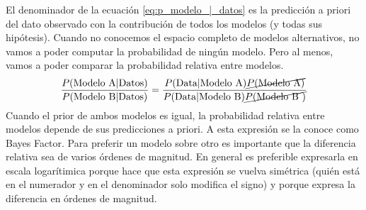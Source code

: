 \documentclass[a4paper,10pt]{book}
\theoremstyle{definition}
\begin{document}
El denominador de la ecuación \ref{eq:p_modelo_|_datos} es la predicción a priori del dato observado con la contribución de todos los modelos (y todas sus hipótesis).
%
Cuando no conocemos el espacio completo de modelos alternativos, no vamos a poder computar la probabilidad de ningún modelo.
%
Pero al menos, vamos a poder comparar la probabilidad relativa entre modelos.
%
 \begin{equation}
\begin{split}
 \frac{P(\text{Modelo A}|\text{Datos})}{P(\text{Modelo B}|\text{Datos})} = \frac{P(\text{Data}|\text{Modelo A})\cancel{P(\text{Modelo A})}}{P(\text{Data}|\text{Modelo B})\cancel{P(\text{Modelo B })}}
\end{split}
\end{equation}
%
Cuando el prior de ambos modelos es igual, la probabilidad relativa entre modelos depende de sus predicciones a priori.
%
A esta expresión se la conoce como Bayes Factor.
%
Para preferir un modelo sobre otro es importante que la diferencia relativa sea de varios órdenes de magnitud.
%
En general es preferible expresarla en escala logarítimica porque hace que esta expresión se vuelva simétrica (quién está en el numerador y en el denominador solo modifica el signo) y porque expresa la diferencia en órdenes de magnitud.

\end{document}
